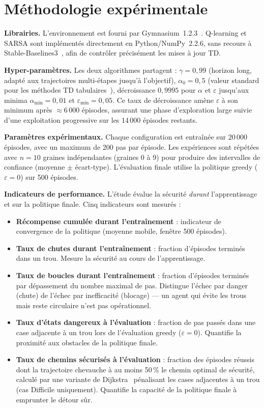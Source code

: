 \documentclass{article}
\begin{document}
\section{Méthodologie expérimentale}

\textbf{Librairies.} L'environnement est fourni par Gymnasium~1.2.3~\citep{towers2024}. Q-learning et SARSA sont implémentés directement en Python/NumPy~2.2.6, sans recours à Stable-Baselines3~\citep{raffin2021}, afin de contrôler précisément les mises à jour TD.

\textbf{Hyper-paramètres.} Les deux algorithmes partagent : $\gamma = 0{,}99$ (horizon long, adapté aux trajectoires multi-étapes jusqu'à l'objectif), $\alpha_0 = 0{,}5$ (valeur standard pour les méthodes TD tabulaires~\citep{sutton2018}), décroissance $0{,}9995$ pour $\alpha$ et $\varepsilon$ jusqu'aux minima $\alpha_{\min}=0{,}01$ et $\varepsilon_{\min}=0{,}05$. Ce taux de décroissance amène $\varepsilon$ à son minimum après $\approx\!6\,000$ épisodes, assurant une phase d'exploration large suivie d'une exploitation progressive sur les 14\,000 épisodes restants.

\textbf{Paramètres expérimentaux.} Chaque configuration est entraînée sur 20\,000 épisodes, avec un maximum de 200 pas par épisode. Les expériences sont répétées avec $n=10$ graines indépendantes (graines 0 à 9) pour produire des intervalles de confiance (moyenne $\pm$ écart-type). L'évaluation finale utilise la politique greedy ($\varepsilon=0$) sur 500 épisodes.

\textbf{Indicateurs de performance.} L'étude évalue la sécurité \emph{durant} l'apprentissage et sur la politique finale. Cinq indicateurs sont mesurés :
\begin{itemize}
  \item \textbf{Récompense cumulée durant l'entraînement} : indicateur de convergence de la politique (moyenne mobile, fenêtre 500 épisodes).
  \item \textbf{Taux de chutes durant l'entraînement} : fraction d'épisodes terminés dans un trou. Mesure la sécurité au cours de l'apprentissage.
  \item \textbf{Taux de boucles durant l'entraînement} : fraction d'épisodes terminés par dépassement du nombre maximal de pas. Distingue l'échec par danger (chute) de l'échec par inefficacité (blocage) — un agent qui évite les trous mais reste circulaire n'est pas opérationnel.
  \item \textbf{Taux d'états dangereux à l'évaluation} : fraction de pas passés dans une case adjacente à un trou lors de l'évaluation greedy ($\varepsilon=0$). Quantifie la proximité aux obstacles de la politique finale.
  \item \textbf{Taux de chemins sécurisés à l'évaluation} : fraction des épisodes réussis dont la trajectoire chevauche à au moins 50\,\% le chemin optimal de sécurité, calculé par une variante de Dijkstra~\citep{dijkstra1959} pénalisant les cases adjacentes à un trou (cas Difficile uniquement). Quantifie la capacité de la politique finale à emprunter le détour sûr.
\end{itemize}
\end{document}
